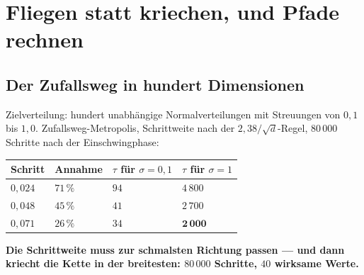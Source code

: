 \chapter{Fliegen statt kriechen, und Pfade rechnen}

\section{Der Zufallsweg in hundert Dimensionen}

\begin{merksatz}
Zielverteilung: hundert unabhängige Normalverteilungen mit Streuungen von $0{,}1$ bis $1{,}0$. Zufallsweg-Metropolis, Schrittweite nach der $2{,}38/\sqrt d$-Regel, $80\,000$ Schritte nach der Einschwingphase:

\begin{center}
{\small
\renewcommand{\arraystretch}{1.48}
\begin{tabular}{@{}P{1.6cm}P{1.8cm}P{2.2cm}P{2.4cm}@{}}
\toprule
\textbf{Schritt} & \textbf{Annahme} & $\tau$ für $\sigma=0{,}1$ & $\tau$ für $\sigma=1$\\
\midrule
$0{,}024$ & $71\,\%$ & $94$ & $4\,800$\\
$0{,}048$ & $45\,\%$ & $41$ & $2\,700$\\
$0{,}071$ & $26\,\%$ & $34$ & $\mathbf{2\,000}$\\
\bottomrule
\end{tabular}}
\end{center}

\begin{center}
\begin{minipage}{0.9\textwidth}
\textbf{Die Schrittweite muss zur schmalsten Richtung passen --- und dann kriecht die Kette in der breitesten: $80\,000$ Schritte, $40$ wirksame Werte.}
\end{minipage}
\end{center}

\begin{center}
\begin{minipage}{0.88\textwidth}
\end{minipage}
\end{center}
\end{merksatz}

